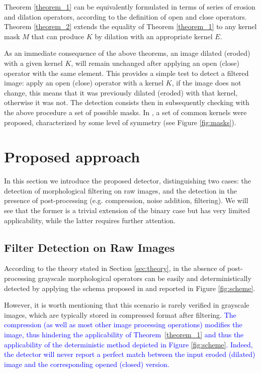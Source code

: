 \documentclass{ieeeaccess}
\newcommand{\revisedtext}[1]{\textcolor{blue}{#1}}
\begin{document}
Theorem \ref{theorem_1} can be equivalently formulated in terms of series of erosion and dilation operators, according to the definition of open and close operators. Theorem \ref{theorem_2} extends the equality of Theorem \ref{theorem_1} to any kernel mask $M$ that can produce $K$ by dilation with an appropriate kernel $E$.

As an immediate consequence of the above theorems, an image dilated (eroded) with a given kernel $K$, will remain unchanged after applying an open (close) operator with the same element. This provides a simple test to detect a filtered image: apply an open (close) operator with a kernel $K$, if the image does not change, this means that it was previously dilated (eroded) with that kernel, otherwise it was not. The detection consists then in subsequently checking with the above procedure a set of possible masks. In \cite{de2017detecting}, a set of common kernels were proposed, characterized by some level of symmetry (see Figure \ref{fig:masks}).



\section{Proposed approach}
\label{sec:method}

In this section we introduce the proposed detector, distinguishing two cases: the detection of morphological filtering on raw images, and the detection in the presence of post-processing (e.g. compression, noise addition, filtering). We will see that the former is a trivial extension of the binary case but has very limited applicability, while the latter requires further attention.



\subsection{Filter Detection on Raw Images}

According to the theory stated in Section \ref{sec:theory}, in the absence of post-processing grayscale morphological operators can be easily and deterministically detected by applying the schema proposed in 
\cite{de2017detecting} and reported in Figure \ref{fig:scheme}.

However, it is worth mentioning that this scenario is rarely verified in grayscale images, which are typically stored in compressed format after filtering. \revisedtext{The compression (as well as most other image processing operations)  modifies the image, thus hindering the applicability of Theorem~\ref{theorem_1} and thus the applicability of the deterministic method depicted in Figure \ref{fig:scheme}. Indeed, the detector will never report a perfect match between the input eroded (dilated) image and the corresponding opened (closed) version.}
\end{document}

